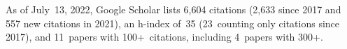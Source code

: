 %
As of July~13, 2022, Google Scholar lists
6,604 citations (2,633 since 2017 and 557 new citations in 2021),
an h-index of~35 (23~counting only citations since 2017),
and 11~papers with 100+~citations, including 4~papers with 300+.
